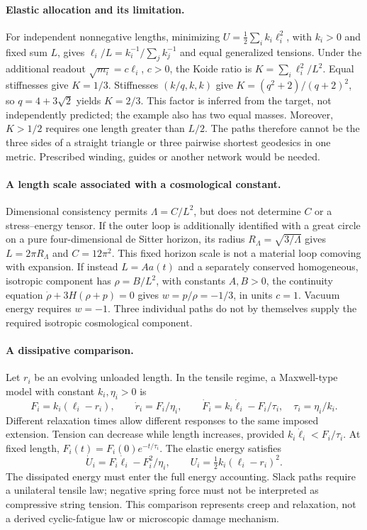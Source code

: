 \paragraph{Elastic allocation and its limitation.}
For independent nonnegative lengths, minimizing
$U=\tfrac12\sum_i k_i\ell_i^2$, with $k_i>0$ and fixed sum $L$,
gives $\ell_i/L=k_i^{-1}/\sum_j k_j^{-1}$ and equal generalized
tensions. Under the additional readout $\sqrt{m_i}=c\ell_i$, $c>0$,
the Koide ratio is $K=\sum_i\ell_i^2/L^2$.
Equal stiffnesses give $K=1/3$. Stiffnesses $(k/q,k,k)$ give
$K=(q^2+2)/(q+2)^2$, so $q=4+3\sqrt2$ yields $K=2/3$.
This factor is inferred from the target, not independently predicted;
the example also has two equal masses. Moreover, $K>1/2$ requires one
length greater than $L/2$. The paths therefore cannot be the three
sides of a straight triangle or three pairwise shortest geodesics in
one metric. Prescribed winding, guides or another network would be needed.

\paragraph{A length scale associated with a cosmological constant.}
Dimensional consistency permits $\Lambda=C/L^2$, but does not determine
$C$ or a stress--energy tensor. If the outer loop is additionally
identified with a great circle on a pure four-dimensional de Sitter
horizon, its radius $R_\Lambda=\sqrt{3/\Lambda}$ gives
$L=2\pi R_\Lambda$ and $C=12\pi^2$.
This fixed horizon scale is not a material loop comoving with expansion.
If instead $L=Aa(t)$ and a separately conserved homogeneous,
isotropic component has $\rho=B/L^2$, with constants $A,B>0$, the continuity equation
$\dot\rho+3H(\rho+p)=0$ gives $w=p/\rho=-1/3$, in units $c=1$.
Vacuum energy requires $w=-1$. Three individual paths do not by
themselves supply the required isotropic cosmological component.

\paragraph{A dissipative comparison.}
Let $r_i$ be an evolving unloaded length. In the tensile regime, a
Maxwell-type model with constant $k_i,\eta_i>0$ is
\begin{equation}
 F_i=k_i(\ell_i-r_i),\qquad
 \dot r_i=F_i/\eta_i,\qquad
 \dot F_i=k_i\dot\ell_i-F_i/\tau_i,\quad \tau_i=\eta_i/k_i.
\end{equation}
Different relaxation times allow different responses to the same imposed
extension. Tension can decrease while length increases, provided
$k_i\dot\ell_i<F_i/\tau_i$. At fixed length,
$F_i(t)=F_i(0)e^{-t/\tau_i}$. The elastic energy satisfies
\begin{equation}
 \dot U_i=F_i\dot\ell_i-F_i^2/\eta_i,\qquad
 U_i=\tfrac12 k_i(\ell_i-r_i)^2.
\end{equation}
The dissipated energy must enter the full energy accounting. Slack paths
require a unilateral tensile law; negative spring force must not be
interpreted as compressive string tension. This comparison represents
creep and relaxation, not a derived cyclic-fatigue law or microscopic
damage mechanism.

